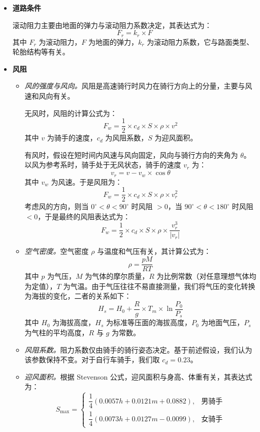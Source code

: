 \documentclass[11pt,a4paper]{ctexart}
\begin{document}
\begin{itemize}
\item \textbf{道路条件}

滚动阻力主要由地面的弹力与滚动阻力系数决定，其表达式为：
\[
F_r=k_r\times F
\]
其中 $F_r$ 为滚动阻力，$F$ 为地面的弹力，$k_r$ 为滚动阻力系数，它与路面类型、轮胎结构等有关。

\item \textbf{风阻}

\begin{itemize}
\item \emph{风的强度与风向。}风阻是高速骑行时风力在骑行方向上的分量，主要与风速和风向有关。

无风时，风阻的计算公式为：
\[
F_w=\frac{1}{2}\times c_d\times S\times \rho\times v^{2}
\]
其中 $v$ 为骑手的速度，$c_d$ 为风阻系数，$S$ 为迎风面积。

有风时，假设在短时间内风速与风向固定，风向与骑行方向的夹角为 $\theta$。以风为参考系时，骑手处于无风状态，骑手的速度 $v_r$ 为：
\[
v_r=v-v_w\times\cos\theta
\]
其中 $v_w$ 为风速。于是风阻为：
\[
F_w=\frac{1}{2}\times c_d\times S\times \rho\times v_r^{2}
\]
考虑风的方向，则当 $0^{\circ}<\theta<90^{\circ}$ 时风阻 $>0$，当 $90^{\circ}<\theta<180^{\circ}$ 时风阻 $<0$，于是最终的风阻表达式为：
\[
F_w=\frac{1}{2}\times c_d\times S\times \rho\times \frac{v_r^{3}}{\left|v_r\right|}
\]

\item \emph{空气密度。}空气密度 $\rho$ 与温度和气压有关，其计算公式为：
\[
\rho=\frac{pM}{RT}
\]
其中 $p$ 为气压，$M$ 为气体的摩尔质量，$R$ 为比例常数（对任意理想气体均为定值），$T$ 为气温。由于气压往往不易直接测量，我们将气压的变化转换为海拔的变化，二者的关系如下：
\[
H_s=H_0+\frac{R}{g}\times T_m\times \ln\frac{P_0}{P_s}
\]
其中 $H_0$ 为海拔高度，$H_s$ 为标准等压面的海拔高度，$P_0$ 为地面气压，$P_s$ 为气柱的平均高度，$R$ 与 $g$ 为常数。

\item \emph{风阻系数。}阻力系数仅由骑手的骑行姿态决定。基于前述假设，我们认为该参数保持不变。对于自行车骑手，我们取 $c_d=0.23$。

\item \emph{迎风面积。}根据 Stevenson 公式，迎风面积与身高、体重有关，其表达式为：
\[
S_{\max}=
\begin{cases}
\dfrac{1}{4}(0.0057h+0.0121m+0.0882), & \text{男骑手}\\[0.5em]
\dfrac{1}{4}(0.0073h+0.0127m-0.0099), & \text{女骑手}
\end{cases}
\]
\end{itemize}
\end{itemize}
\end{document}
